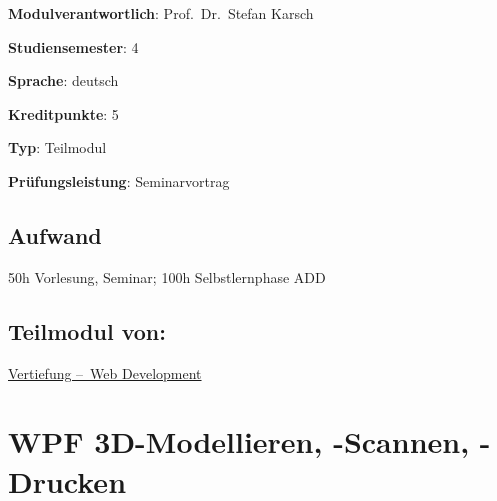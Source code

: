 \begin{modulHead}
\textbf{Modulverantwortlich}: Prof.~Dr.~Stefan
Karsch
\end{modulHead}
\begin{modulHead}
\textbf{Studiensemester}:
4
\end{modulHead}
\begin{modulHead}
\textbf{Sprache}:
deutsch
\end{modulHead}
\begin{modulHead}
\textbf{Kreditpunkte}:
5
\end{modulHead}
\begin{modulHead}
\textbf{Typ}:
Teilmodul
\end{modulHead}
\begin{modulHead}
\textbf{Prüfungsleistung}:
Seminarvortrag
\end{modulHead}


\hypertarget{aufwandpathlabelmi-2017modulbeschreibungen-bachelorba_wd_praktische-it-sicherheit}{%
\section*{Aufwand\label{/mi-2017/modulbeschreibungen-bachelor/BA_WD_Praktische-IT-Sicherheit}}\label{aufwandpathlabelmi-2017modulbeschreibungen-bachelorba_wd_praktische-it-sicherheit}}

50h Vorlesung, Seminar; 100h Selbstlernphase ADD

\hypertarget{teilmodul-vonpathlabelmi-2017modulbeschreibungen-bachelorba_wd_praktische-it-sicherheit}{%
\section*{Teilmodul
von:\label{/mi-2017/modulbeschreibungen-bachelor/BA_WD_Praktische-IT-Sicherheit}}\label{teilmodul-vonpathlabelmi-2017modulbeschreibungen-bachelorba_wd_praktische-it-sicherheit}}

\hyperref[/mi-2017/modulbeschreibungen-bachelor/BA_Vertiefung-Web_Development]{Vertiefung – Web Development}

\hypertarget{wpf-3d-modellieren--scannen--druckenpathlabelmi-2017modulbeschreibungen-bachelorba_wpf-3d-msd}{%
\chapter{WPF 3D-Modellieren, -Scannen,
-Drucken\label{/mi-2017/modulbeschreibungen-bachelor/BA_WPF-3D-MSD}}\label{wpf-3d-modellieren--scannen--druckenpathlabelmi-2017modulbeschreibungen-bachelorba_wpf-3d-msd}}

